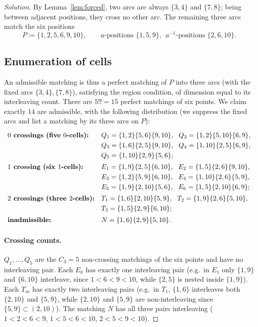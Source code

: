 \documentclass{amsart}
\theoremstyle{definition}
\newcommand{\defeq}{\coloneqq}
\begin{document}
\begin{proof}[Solution]
By Lemma~\ref{lem:forced}, two arcs are always $\{3,4\}$ and $\{7,8\}$; being between adjacent
positions, they cross no other arc. The remaining three arcs match the six positions
\[
  P\defeq\{1,2,5,6,9,10\},\qquad a\text{-positions }\{1,5,9\},\ \ a^{-1}\text{-positions }\{2,6,10\}.
\]

\subsection{Enumeration of cells}\label{sec:enum}

An admissible matching is thus a perfect matching of $P$ into three arcs (with the fixed arcs
$\{3,4\},\{7,8\}$), satisfying the region condition, of dimension equal to its interleaving
count. There are $5!!=15$ perfect matchings of six points. We claim exactly $14$ are
admissible, with the following distribution (we suppress the fixed arcs and list a matching by
its three arcs on $P$):
\begin{equation}\label{eq:list}
\renewcommand{\arraystretch}{1.25}
\begin{array}{l@{\quad}l}
\textbf{$0$ crossings (five $0$-cells):}
 & Q_1=\{1,2\}\{5,6\}\{9,10\},\ \ Q_2=\{1,2\}\{5,10\}\{6,9\},\\
 & Q_3=\{1,6\}\{2,5\}\{9,10\},\ \ Q_4=\{1,10\}\{2,5\}\{6,9\},\\
 & Q_5=\{1,10\}\{2,9\}\{5,6\};\\[2pt]
\textbf{$1$ crossing (six $1$-cells):}
 & E_1=\{1,9\}\{2,5\}\{6,10\},\ \ E_2=\{1,5\}\{2,6\}\{9,10\},\\
 & E_3=\{1,2\}\{5,9\}\{6,10\},\ \ E_4=\{1,10\}\{2,6\}\{5,9\},\\
 & E_5=\{1,9\}\{2,10\}\{5,6\},\ \ E_6=\{1,5\}\{2,10\}\{6,9\};\\[2pt]
\textbf{$2$ crossings (three $2$-cells):}
 & T_1=\{1,6\}\{2,10\}\{5,9\},\ \ T_2=\{1,9\}\{2,6\}\{5,10\},\\
 & T_3=\{1,5\}\{2,9\}\{6,10\};\\[2pt]
\textbf{inadmissible:} & N=\{1,6\}\{2,9\}\{5,10\}.
\end{array}
\end{equation}

\paragraph{Crossing counts.}
$Q_1,\dots,Q_5$ are the $C_3=5$ non-crossing matchings of the six points and have no
interleaving pair. Each $E_k$ has exactly one interleaving pair (e.g.\ in $E_1$ only
$\{1,9\}$ and $\{6,10\}$ interleave, since $1<6<9<10$, while $\{2,5\}$ is nested inside
$\{1,9\}$). Each $T_m$ has exactly two interleaving pairs (e.g.\ in $T_1$, $\{1,6\}$ interleaves
both $\{2,10\}$ and $\{5,9\}$, while $\{2,10\}$ and $\{5,9\}$ are non-interleaving since
$\{5,9\}\subset(2,10)$). The matching $N$ has all three pairs interleaving
($1<2<6<9$, $1<5<6<10$, $2<5<9<10$).


\end{proof}
\end{document}
